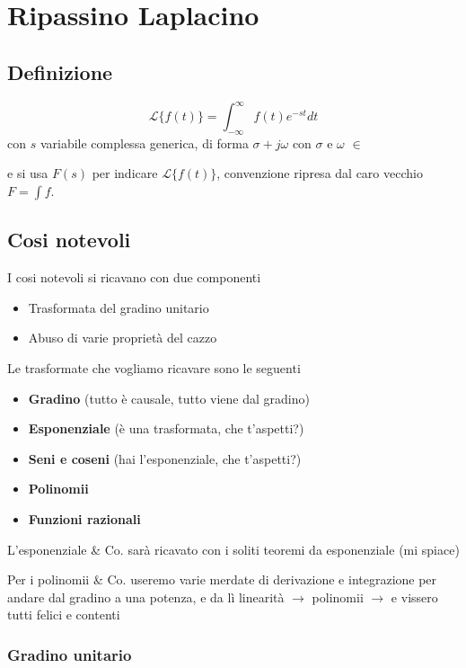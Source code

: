 \documentclass[11pt]{article}
\date{\today}
\title{}
\begin{document}
\tableofcontents

\section{Ripassino Laplacino}
\label{sec:org0bac5bd}

\subsection{Definizione}
\label{sec:orgf46f581}
\[\mathcal{L}\{f(t)\} = \int_{-\infty}^{\infty} f(t) e^{-st} dt \]
con \(s\) variabile complessa generica, di forma \(\sigma + j\omega\) con
\(\sigma\) e \(\omega\) \(\in\) 

e si usa \(F(s)\) per indicare \(\mathcal{L}\{f(t)\}\), convenzione
ripresa dal caro vecchio \(F = \int f\).

\subsection{Cosi notevoli}
\label{sec:orga2402fc}

I cosi notevoli si ricavano con due componenti
\begin{itemize}
\item Trasformata del gradino unitario
\item Abuso di varie proprietà del cazzo
\end{itemize}

Le trasformate che vogliamo ricavare sono le seguenti
\begin{itemize}
\item \textbf{Gradino} (tutto è causale, tutto viene dal gradino)
\item \textbf{Esponenziale} (è una trasformata, che t'aspetti?)
\item \textbf{Seni e coseni} (hai l'esponenziale, che t'aspetti?)
\item \textbf{Polinomii}
\item \textbf{Funzioni razionali}
\end{itemize}

L'esponenziale \& Co. sarà ricavato con i soliti teoremi da
esponenziale (mi spiace)

Per i polinomii \& Co. useremo varie merdate di derivazione e
integrazione per andare dal gradino a una potenza, e da lì linearità
\(\to\) polinomii \(\to\) e vissero tutti felici e contenti

\subsubsection{Gradino unitario}
\label{sec:org68c2429}
\end{document}
